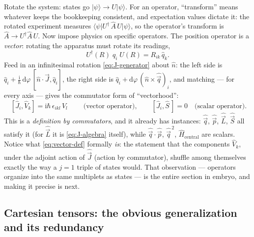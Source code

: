\documentclass[11pt]{article}
\theoremstyle{plain}
\theoremstyle{definition}
\theoremstyle{remark}
\newcommand{\dd}{\mathrm{d}}
\newcommand{\ii}{\mathrm{i}}
\newcommand{\op}[1]{\hat{#1}}
\newcommand{\ket}[1]{\lvert #1 \rangle}
\newcommand{\bra}[1]{\langle #1 \rvert}
\begin{document}
Rotate the system: states go $\ket\psi \to U\ket\psi$. For an
operator, ``transform'' means whatever keeps the bookkeeping
consistent, and expectation values dictate it: the rotated
experiment measures $\bra\psi U^\dagger\,\op A\,U\ket\psi$, so the
operator's transform is $\op A \to U^\dagger \op A\, U$. Now impose
physics on specific operators. The position operator is a
\emph{vector}: rotating the apparatus must rotate its readings,
\begin{equation}
  U^\dagger(R)\;\op q_i\;U(R) = R_{ik}\,\op q_k .
  \label{eq:vector-finite}
\end{equation}
Feed in an infinitesimal rotation
\eqref{eq:J-generator} about $\hat n$: the left side is
$\op q_i + \tfrac{\ii}{\hbar}\,\dd\varphi\,[\hat n\cdot\op{\vec J},
\op q_i]$, the right side is
$\op q_i + \dd\varphi\,(\hat n\times\op{\vec q})_i$, and matching
--- for every axis --- gives the commutator form of
``vectorhood'':
\begin{equation}
  \boxed{\;
  [\op J_i, \op V_k] = \ii\hbar\,\epsilon_{ikl}\,\op V_l
  \;}
  \qquad\text{(vector operator)},
  \qquad
  [\op J_i, \op S\,] = 0
  \quad\text{(scalar operator)}.
  \label{eq:vector-def}
\end{equation}
This is a \emph{definition by commutators}, and it already has
instances: $\op{\vec q}$, $\op{\vec p}$, $\op{\vec L}$,
$\op{\vec S}$ all satisfy it (for $\op{\vec L}$ it is
\eqref{eq:J-algebra} itself), while $\op{\vec q}\cdot\op{\vec p}$,
$\op{\vec q}^{\,2}$, $\op H_{\text{central}}$ are scalars. Notice
what \eqref{eq:vector-def} formally \emph{is}: the statement that
the components $\op V_k$, under the adjoint action of
$\op{\vec J}$ (action by commutator), shuffle among themselves
exactly the way a $j = 1$ triple of states would. That observation
--- operators organize into the same multiplets as states --- is
the entire section in embryo, and making it precise is next.

\subsection{Cartesian tensors: the obvious generalization and its
redundancy}\label{sec:cartesian-tensors}
\end{document}
